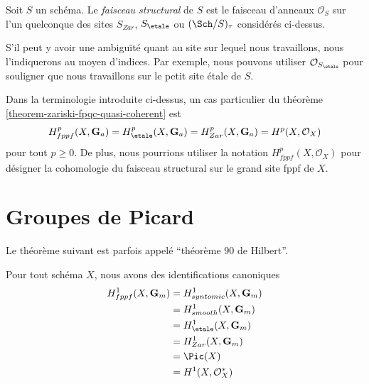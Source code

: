 \begin{definition}
\label{definition-structure-sheaf}
Soit $S$ un sch\'ema. Le {\it faisceau structural} de $S$ est le faisceau d'anneaux
$\mathcal{O}_S$
sur l'un quelconque des sites $S_{Zar}$, $S_\etale$ ou $(\Sch/S)_\tau$
consid\'er\'es ci-dessus.
\end{definition}

\noindent
S'il peut y avoir une ambigu\"it\'e quant au site sur lequel nous travaillons,
nous l'indiquerons au moyen d'indices. Par exemple, nous pouvons utiliser
$\mathcal{O}_{S_\etale}$ pour souligner que nous travaillons sur le
petit site \'etale de $S$.

\begin{remark}
\label{remark-special-case-fpqc-cohomology-quasi-coherent}
Dans la terminologie introduite ci-dessus, un cas particulier du
th\'eor\`eme \ref{theorem-zariski-fpqc-quasi-coherent}
est
$$
H_{fppf}^p(X, \mathbf{G}_a) =
H_\etale^p(X, \mathbf{G}_a) =
H_{Zar}^p(X, \mathbf{G}_a) =
H^p(X, \mathcal{O}_X)
$$
pour tout $p \geq 0$. De plus, nous pourrions utiliser la notation
$H^p_{fppf}(X, \mathcal{O}_X)$ pour d\'esigner la cohomologie du
faisceau structural sur le grand site fppf de $X$.
\end{remark}




\section{Groupes de Picard}
\label{section-picard-groups}

\noindent
Le th\'eor\`eme suivant est parfois appel\'e ``th\'eor\`eme 90 de Hilbert''.

\begin{theorem}
\label{theorem-picard-group}
Pour tout sch\'ema $X$, nous avons des identifications canoniques
\begin{align*}
H_{fppf}^1(X, \mathbf{G}_m) & = H^1_{syntomic}(X, \mathbf{G}_m) \\
& = H^1_{smooth}(X, \mathbf{G}_m) \\
& = H_\etale^1(X, \mathbf{G}_m) \\
& = H^1_{Zar}(X, \mathbf{G}_m) \\
& = \Pic(X) \\
& = H^1(X, \mathcal{O}_X^*)
\end{align*}
\end{theorem}

